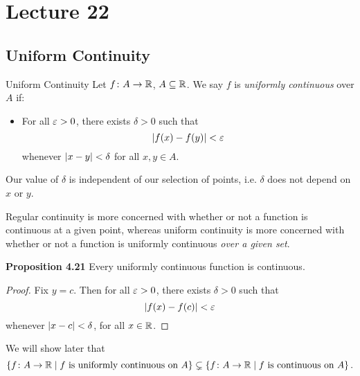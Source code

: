 \documentclass[class=article, crop=false]{standalone}
\begin{document}
  \section{Lecture 22}
  \subsection{Uniform Continuity}
  \begin{definition}{Uniform Continuity}
    Let $f\colon A\to \mathbb{R}$, $A\subseteq\mathbb{R}$. We say $f$ is \emph{uniformly continuous} over $A$ if:
    \begin{itemize}
      \item For all $\varepsilon > 0$, there exists $\delta > 0$ such that
      \[
        \left\lvert f(x) - f(y) \right\rvert < \varepsilon
      \]
      whenever $\left\lvert x - y \right\rvert < \delta$ for all $x, y\in A$.
    \end{itemize}
  \end{definition}
  \begin{note}{}
    Our value of $\delta$ is independent of our selection of points, i.e. $\delta$ does not depend on $x$ or $y$.
  \end{note}
  \begin{note}{}
    Regular continuity is more concerned with whether or not a function is continuous at a given point, whereas uniform continuity is more concerned with whether or not a function is uniformly continuous \emph{over a given set}.
  \end{note}
  \textbf{Proposition 4.21} Every uniformly continuous function is continuous.
  \begin{proof}
    Fix $y = c$. Then for all $\varepsilon > 0$, there exists $\delta > 0$ such that
    \[
      \left\lvert f(x) - f(c) \right\rvert < \varepsilon
    \]
    whenever $\left\lvert x - c \right\rvert < \delta$, for all $x\in\mathbb{R}$.
  \end{proof}
  \begin{note}{}
    We will show later that
    \[
      \left\{f\colon A\to \mathbb{R}\mid f\text{ is uniformly continuous on }A\right\}\subsetneq \left\{f\colon A\to \mathbb{R}\mid f\text{ is continuous on }A\right\}.
    \]
  \end{note}
\end{document}
